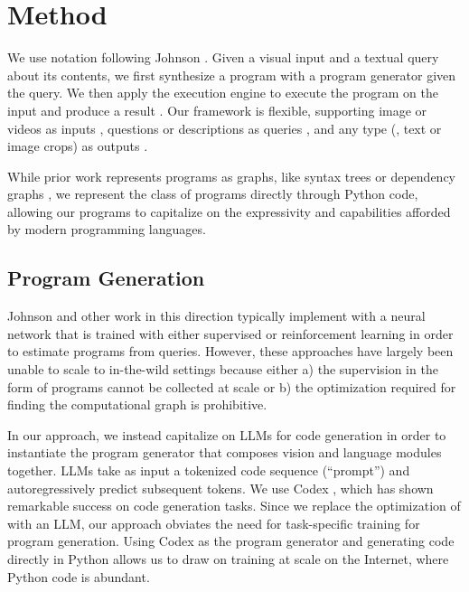 \documentclass[10pt,twocolumn,letterpaper]{article}
\begin{document}
\section{Method}\label{sec:method}
We use notation following Johnson \etal\cite{johnson_inferring_2017}.
Given a visual input  and a textual query  about its contents, we first synthesize a program  with a program generator  given the query. We then apply the execution engine  to execute the program  on the input  and produce a result . Our framework is flexible, supporting image or videos as inputs , questions or descriptions as queries , and any type (\eg, text or image crops) as outputs . 

While prior work represents programs as graphs, like syntax trees \cite{johnson_inferring_2017} or dependency graphs \cite{cao_interpretable_2021}, we represent the class of programs  directly through Python code, allowing our programs to capitalize on the expressivity and capabilities afforded by modern programming languages.

\subsection{Program Generation}

Johnson \etal\cite{johnson_inferring_2017} and other work in this direction \cite{hu_learning_2017,yi_neural-symbolic_2018,hudson_compositional_2018} typically implement  with a neural network that is trained with either supervised or reinforcement learning in order to estimate programs from queries. However, these approaches have largely been unable to scale to in-the-wild settings because either a) the supervision in the form of programs cannot be collected at scale or b) the optimization required for finding the computational graph is prohibitive.

In our approach, we instead capitalize on LLMs for code generation in order to instantiate the program generator  that composes vision and language modules together. 
LLMs take as input a tokenized code sequence (``prompt'') and autoregressively predict subsequent tokens. We use Codex \cite{chen2021evaluating}, which has shown remarkable success on code generation tasks. Since we replace the optimization of  with an LLM, our approach 
obviates the need for task-specific training for program generation. Using Codex as the program generator and generating code directly in Python allows us to draw on training at scale on the Internet, where Python code is abundant.
\end{document}
